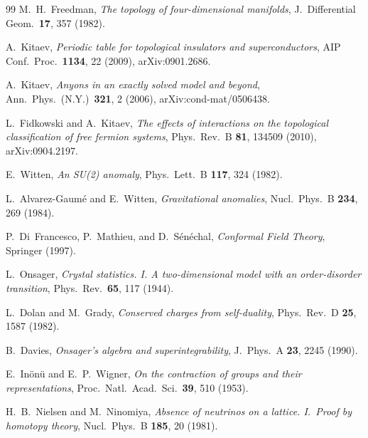 \documentclass[aps,prd,reprint,nofootinbib,superscriptaddress]{revtex4-2}
\begin{document}
\begin{thebibliography}{99}
M.~H.~Freedman,
\emph{The topology of four-dimensional manifolds},
J.\ Differential Geom.\ \textbf{17}, 357 (1982).

A.~Kitaev,
\emph{Periodic table for topological insulators and superconductors},
AIP Conf.~Proc.~\textbf{1134}, 22 (2009), arXiv:0901.2686.

A.~Kitaev,
\emph{Anyons in an exactly solved model and beyond},
Ann.~Phys.~(N.Y.)~\textbf{321}, 2 (2006), arXiv:cond-mat/0506438.

L.~Fidkowski and A.~Kitaev,
\emph{The effects of interactions on the topological classification of
free fermion systems},
Phys.~Rev.~B \textbf{81}, 134509 (2010), arXiv:0904.2197.

E.~Witten,
\emph{An SU(2) anomaly},
Phys.~Lett.~B \textbf{117}, 324 (1982).

L.~Alvarez-Gaum\'e and E.~Witten,
\emph{Gravitational anomalies},
Nucl.~Phys.~B \textbf{234}, 269 (1984).

P.~Di~Francesco, P.~Mathieu, and D.~S\'en\'echal,
\emph{Conformal Field Theory},
Springer (1997).

L.~Onsager,
\emph{Crystal statistics. I. A two-dimensional model with an
order-disorder transition},
Phys.~Rev.~\textbf{65}, 117 (1944).

L.~Dolan and M.~Grady,
\emph{Conserved charges from self-duality},
Phys.~Rev.~D \textbf{25}, 1587 (1982).

B.~Davies,
\emph{Onsager's algebra and superintegrability},
J.~Phys.~A \textbf{23}, 2245 (1990).

E.~In\"on\"u and E.~P.~Wigner,
\emph{On the contraction of groups and their representations},
Proc.~Natl.~Acad.~Sci.~\textbf{39}, 510 (1953).

H.~B.~Nielsen and M.~Ninomiya,
\emph{Absence of neutrinos on a lattice. I.~Proof by homotopy theory},
Nucl.~Phys.~B \textbf{185}, 20 (1981).


\end{thebibliography}
\end{document}
